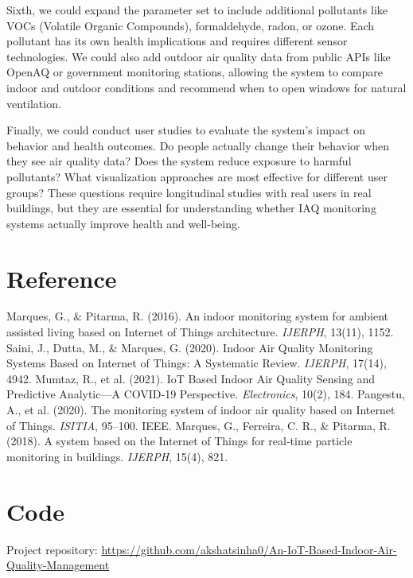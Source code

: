 \documentclass[12pt]{report}
\begin{document}
Sixth, we could expand the parameter set to include additional pollutants like VOCs (Volatile Organic Compounds), formaldehyde, radon, or ozone. Each pollutant has its own health implications and requires different sensor technologies. We could also add outdoor air quality data from public APIs like OpenAQ or government monitoring stations, allowing the system to compare indoor and outdoor conditions and recommend when to open windows for natural ventilation.

Finally, we could conduct user studies to evaluate the system's impact on behavior and health outcomes. Do people actually change their behavior when they see air quality data? Does the system reduce exposure to harmful pollutants? What visualization approaches are most effective for different user groups? These questions require longitudinal studies with real users in real buildings, but they are essential for understanding whether IAQ monitoring systems actually improve health and well-being.

\section{Reference}
\begin{thebibliography}{9}
 Marques, G., \& Pitarma, R. (2016). An indoor monitoring system for ambient assisted living based on Internet of Things architecture. \emph{IJERPH}, 13(11), 1152.
 Saini, J., Dutta, M., \& Marques, G. (2020). Indoor Air Quality Monitoring Systems Based on Internet of Things: A Systematic Review. \emph{IJERPH}, 17(14), 4942.
 Mumtaz, R., et al. (2021). IoT Based Indoor Air Quality Sensing and Predictive Analytic—A COVID‑19 Perspective. \emph{Electronics}, 10(2), 184.
 Pangestu, A., et al. (2020). The monitoring system of indoor air quality based on Internet of Things. \emph{ISITIA}, 95--100. IEEE.
 Marques, G., Ferreira, C. R., \& Pitarma, R. (2018). A system based on the Internet of Things for real‑time particle monitoring in buildings. \emph{IJERPH}, 15(4), 821.
\end{thebibliography}

\section{Code}
Project repository: \url{https://github.com/akshatsinha0/An-IoT-Based-Indoor-Air-Quality-Management}
\end{document}
